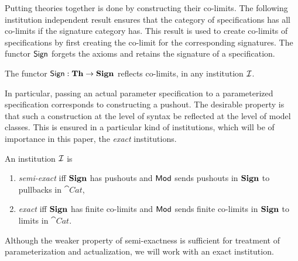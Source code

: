 Putting  theories together is done by
constructing their co-limits. The following institution independent result ensures that the category of
specifications has all co-limits if the signature category has.  This
result is used to create co-limits of specifications by first creating the
co-limit for the corresponding signatures. The functor ${\sf {Sign}}$ forgets the
axioms and retains the signature of a specification.
%
\begin{proposition} %
\label{pro:reflects}
The functor  ${\sf {Sign}}: {\bf Th} \to {\bf Sign}$ reflects co-limits, in any institution ${\mathcal{I}}$.
\end{proposition}
%
In particular, passing an actual parameter specification to a
parameterized specification corresponds to constructing a pushout. The
desirable property is that such a construction at the level of syntax be
reflected at the level of model classes. This is ensured in a particular kind
of institutions, which will be of importance in this paper, 
the {\em exact} institutions.
%
\begin{definition} An institution ${\mathcal{I}}$ is 
\begin{enumerate}\MyLPar
\item {\em semi-exact} iff ${\bf Sign}$
has pushouts and ${\sf {Mod}}$ sends pushouts in ${\bf Sign}$ to pullbacks in
$\cat{Cat}$,
\item {\em exact} iff ${\bf Sign}$ has finite co-limits and ${\sf {Mod}}$ sends
finite co-limits in ${\bf Sign}$ to limits in $\cat{Cat}$.
\end{enumerate}
\end{definition}
Although the weaker property of semi-exactness is sufficient for treatment
of parameterization and actualization, we will work
with an exact institution. 


